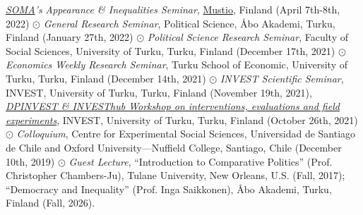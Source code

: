 
 \emph{\href{https://soma.utu.fi/en}{SOMA}'s} \emph{Appearance \& Inequalities Seminar}, \href{https://www.mustionlinna.fi/en/}{Mustio}, Finland (April 7th-8th, 2022) $\odot$ \emph{General Research Seminar}, Political Science, \AA bo Akademi, Turku, Finland (January 27th, 2022) $\odot$ \emph{Political Science Research Seminar}, Faculty of Social Sciences, University of Turku, Turku, Finland (December 17th, 2021) $\odot$ \emph{Economics Weekly Research Seminar}, Turku School of Economic, University of Turku, Turku, Finland (December 14th, 2021) $\odot$ \emph{INVEST Scientific Seminar}, INVEST, University of Turku, Turku, Finland (November 19th, 2021), \href{https://invest.utu.fi/events/dpinvest-investhub-workshop-on-interventions-evaluations-and-field-experiments/}{\emph{DPINVEST \& INVESThub Workshop on interventions, evaluations and field experiments}}, INVEST, University of Turku, Turku, Finland (October 26th, 2021) $\odot$ \emph{Colloquium}, Centre for Experimental Social Sciences, Universidad de Santiago de Chile and Oxford University---Nuffield College, Santiago, Chile (December 10th, 2019) $\odot$ \emph{Guest Lecture},  ``Introduction to Comparative Politics'' (Prof. Christopher Chambers-Ju), Tulane University, New Orleans, U.S. (Fall, 2017); ``Democracy and Inequality'' (Prof. Inga Saikkonen), \AA bo Akademi, Turku, Finland (Fall, 2026).

